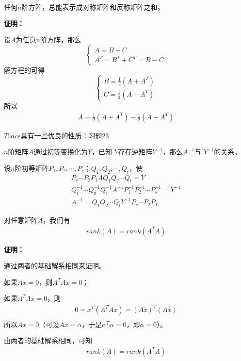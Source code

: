 \documentclass{article}
\begin{document}
\begin{zremark}
  任何$n$阶方阵，总能表示成对称矩阵和反称矩阵之和。
\end{zremark}

\textbf{证明：}

设$A$为任意$n$阶方阵，那么
\begin{equation*}
  \begin{cases*}
    A = B + C \\
    A^T = B^T + C^T = B - C
  \end{cases*}
\end{equation*}
解方程的可得
\begin{equation*}
  \begin{cases*}
    B = \frac{1}{2}(A + A^{T}) \\
    C = \frac{1}{2}(A - A^{T})
  \end{cases*}
\end{equation*}
所以
\begin{align*}
  A = \frac{1}{2}(A+A^{T}) + \frac{1}{2}(A-A^{T})
\end{align*}

\begin{zremark}
  $Trace$具有一些优良的性质：习题23
\end{zremark}

\begin{zremark}
  $n$阶矩阵$A$通过初等变换化为$Y$，已知
  $Y$存在逆矩阵$Y^{-1}$，那么$A^{-1}$与
  $Y^{-1}$的关系。
\end{zremark}

设$n$阶初等矩阵$P_1, P_2, \cdots, P_s$；$Q_1, Q_2, \cdots, Q_t$，使
\begin{align*}
  P_s \cdots P_2 P_1 A Q_1 Q_2 \cdots Q_t = Y                                         \\
  Q_t^{-1} \cdots Q_2^{-1} Q_1^{-1} A^{-1} P_1^{-1} P_2^{-1} \cdots P_s^{-1} = Y^{-1} \\
  A^{-1} = Q_1 Q_2 \cdots Q_t Y^{-1} P_s \cdots P_2P_1
\end{align*}

\begin{zremark}
  对任意矩阵$A$，我们有
  \begin{align*}
    rank(A) = rank(A^T A)
  \end{align*}
\end{zremark}

\textbf{证明：}

通过两者的基础解系相同来证明。

如果$Ax = 0$，则$A^T A x = 0$；

如果$A^T A x = 0$，则
\begin{align*}
  0 = x^T (A^T A x) = (A x)^T (A x) \\
\end{align*}
所以$Ax = 0$（可设$Ax = \alpha$，于是$\alpha^T \alpha = 0$，即$\alpha = 0$）。

由两者的基础解系相同，可知
\begin{align*}
  rank(A) = rank(A^T A)
\end{align*}
\end{document}
